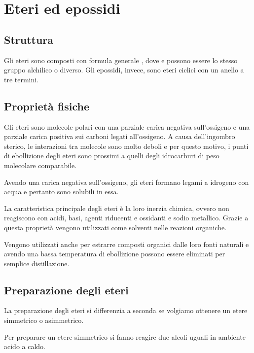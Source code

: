 \chapter{Eteri ed epossidi}
\section{Struttura}
Gli eteri sono composti con formula generale , dove  e  possono essere lo stesso gruppo alchilico o diverso. Gli epossidi, invece, sono eteri ciclici con un anello a tre termini.

\section{Proprietà fisiche}
Gli eteri sono molecole polari con una parziale carica negativa sull'ossigeno e una parziale carica positiva sui carboni legati all'ossigeno. A causa dell'ingombro sterico, le interazioni tra molecole sono molto deboli e per questo motivo, i punti di ebollizione degli eteri sono prossimi a quelli degli idrocarburi di peso molecolare comparabile.

Avendo una carica negativa sull'ossigeno, gli eteri formano legami a idrogeno con acqua e pertanto sono solubili in essa.

La caratteristica principale degli eteri è la loro inerzia chimica, ovvero non reagiscono con acidi, basi, agenti riducenti e ossidanti e sodio metallico. Grazie a questa proprietà vengono utilizzati come solventi nelle reazioni organiche.

Vengono utilizzati anche per estrarre composti organici dalle loro fonti naturali e avendo una bassa temperatura di ebollizione possono essere eliminati per semplice distillazione.

\section{Preparazione degli eteri}
La preparazione degli eteri si differenzia a seconda se volgiamo ottenere un etere simmetrico o asimmetrico.

Per preparare un etere simmetrico si fanno reagire due alcoli uguali in ambiente acido a caldo.
\begin{reaction}
\end{reaction}

